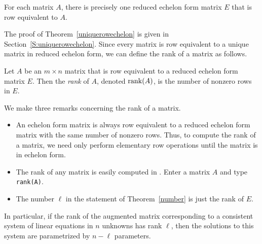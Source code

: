 \documentclass{ximera}
\begin{document}
\begin{theorem} \label{uniquerowechelon}
For each matrix $A$, there is precisely one reduced echelon form
matrix $E$ that is row equivalent  to $A$.
\end{theorem}

The proof of Theorem~\ref{uniquerowechelon} is given in 
Section~\ref{S:uniquerowechelon}.  Since every matrix is row equivalent 
to a unique matrix in reduced echelon form, we can define the rank 
of a matrix as follows.
\begin{definition}  \label{D:rank}
Let $A$ be an $m\times n$ matrix that is row equivalent to a
reduced echelon form matrix $E$.  Then the {\em rank\/} of $A$,
denoted ${\rm rank}(A)$, is the number of nonzero rows in $E$.
\end{definition}  

We make three remarks concerning the rank of a matrix.
\begin{itemize}
\item An echelon form matrix is always row equivalent to a
reduced echelon form matrix with the same number of nonzero
rows.  Thus, to compute the rank of a matrix, we need only
perform elementary row operations until the matrix is in echelon
form.
\item	The rank of any matrix is easily computed in \Matlabp.
Enter a matrix $A$ and type {\tt rank(A)}.
\item The number $\ell$ in the statement of Theorem~\ref{number}
is just the rank of $E$.
\end{itemize}
In particular, if the rank of the augmented matrix corresponding to
a consistent system of linear equations in $n$ unknowns has rank $\ell$,
then the solutions to this system are parametrized by $n-\ell$ parameters.


\EXER

\TEXER
\end{document}
